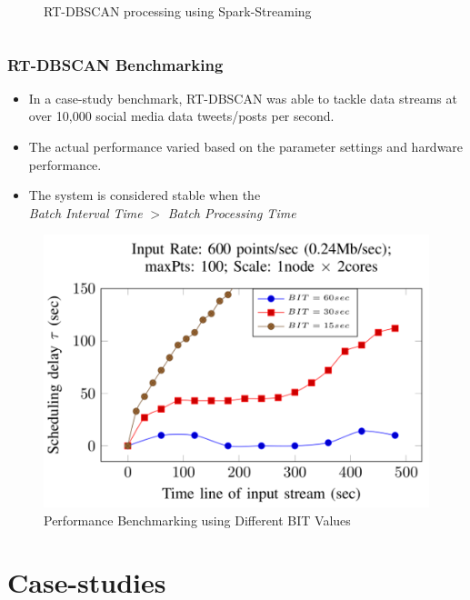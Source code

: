 \begin{frame}
\begin{columns}
\begin{figure}
            \caption{\small RT-DBSCAN processing using Spark-Streaming}
        \end{figure}
    \end{columns}
\end{frame}

\begin{frame}
    \frametitle{RT-DBSCAN Benchmarking}
    \begin{itemize} \small
	    \item  In a case-study benchmark, RT-DBSCAN was able to tackle data streams at over 10,000 social media data tweets/posts per second.
	    \item  The actual performance varied based on the parameter settings and hardware performance.
	    \item The system is considered stable when the\\ {\it Batch Interval Time} $>$  {\it Batch Processing Time}
    \end{itemize}
    \begin{figure}
        \centering
        \includegraphics[width=0.44\linewidth]{resource/figures/rt-dbscan_banchmark.png}
        \vspace{-0.5cm}
        \caption{\small Performance Benchmarking using Different BIT Values}
    \end{figure}
\end{frame}

\section{Case-studies}


